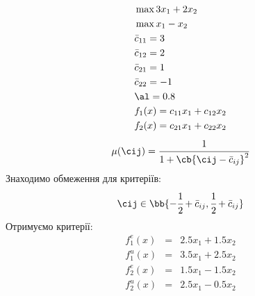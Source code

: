 \begin{tsk}
\begin{eqnarray}
&\max 3x_1+2x_2\\
&\max x_1-x_2\\
&\bar{c}_{11}=3\\
&\bar{c}_{12}=2\\
&\bar{c}_{21}=1\\
&\bar{c}_{22}=-1\\
&\al = 0.8\\
&f_1(x) = c_{11}x_1+c_{12}x_2\\
&f_2(x) = c_{21}x_1+c_{22}x_2
\end{eqnarray}
\begin{equation}
\mu(\cij) = \cfrac{1}{1+\cb{\cij -\bar{c}_{ij}}^2}
\end{equation}
Знаходимо обмеження для критеріїв:
\begin{equation}
\cij\in\bb{-\cfrac12 + \bar{c}_{ij},\cfrac12 +\bar{c}_{ij}}
\end{equation}
Отримуємо критерії:
\begin{eqnarray}
f_1^e (x) &=& 2.5 x_1 +1.5x_2 \\
f_1^u (x) &=& 3.5 x_1 + 2.5x_2\\
f_2^e (x) &=& 1.5x_1 -1.5 x_2 \\
f_2^u (x) &=& 2.5 x_1 - 0.5x_2
\end{eqnarray}
\end{tsk}